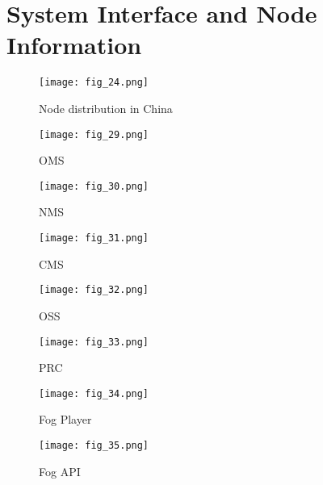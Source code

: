 \chapter{System Interface and Node Information}
\label{chap:appE}

\begin{figure}[htbp]
\centering
	  \texttt{[image: fig\_24.png]}
    \caption{Node distribution in China}
 \label{fig_24}
\end{figure}

\begin{figure}[htbp]
\centering
	  \texttt{[image: fig\_29.png]}
    \caption{OMS}
 \label{fig_29}
\end{figure}

\begin{figure}[htbp]
\centering
	  \texttt{[image: fig\_30.png]}
    \caption{NMS}
 \label{fig_30}
\end{figure}


\begin{figure}[htbp]
\centering
	  \texttt{[image: fig\_31.png]}
    \caption{CMS}
 \label{fig_31}
\end{figure}

\begin{figure}[htbp]
\centering
	  \texttt{[image: fig\_32.png]}
    \caption{OSS}
 \label{fig_32}
\end{figure}

\begin{figure}[htbp]
\centering
	  \texttt{[image: fig\_33.png]}
    \caption{PRC}
 \label{fig_33}
\end{figure}

\begin{figure}[htbp]
\centering
	  \texttt{[image: fig\_34.png]}
    \caption{Fog Player}
 \label{fig_34}
\end{figure}

\begin{figure}[htbp]
\centering
	  \texttt{[image: fig\_35.png]}
    \caption{Fog API}
 \label{fig_35}
\end{figure}

